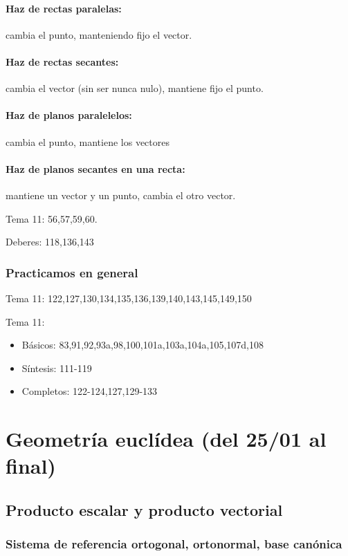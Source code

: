 \paragraph{Haz de rectas paralelas: } cambia el punto, manteniendo fijo el vector. 
\paragraph{Haz de rectas secantes: } cambia el vector (sin ser nunca nulo), mantiene fijo el punto.
\paragraph{Haz de planos paralelelos: } cambia el punto, mantiene los vectores
\paragraph{Haz de planos secantes en una recta: } mantiene un vector y un punto, cambia el otro vector.

\begin{problem}
Tema 11: 56,57,59,60.
\solution
\end{problem}

Deberes: 118,136,143

\subsubsection{Practicamos en general}

Tema 11: 
122,127,130,134,135,136,139,140,143,145,149,150

Tema 11:
\begin{itemize}
  \item Básicos: 83,91,92,93a,98,100,101a,103a,104a,105,107d,108
  \item Síntesis: 111-119
  \item Completos: 122-124,127,129-133
\end{itemize}



\section{Geometría euclídea (del 25/01 al final)}

\subsection{Producto escalar y producto vectorial}
\subsubsection{Sistema de referencia ortogonal, ortonormal, base canónica}
